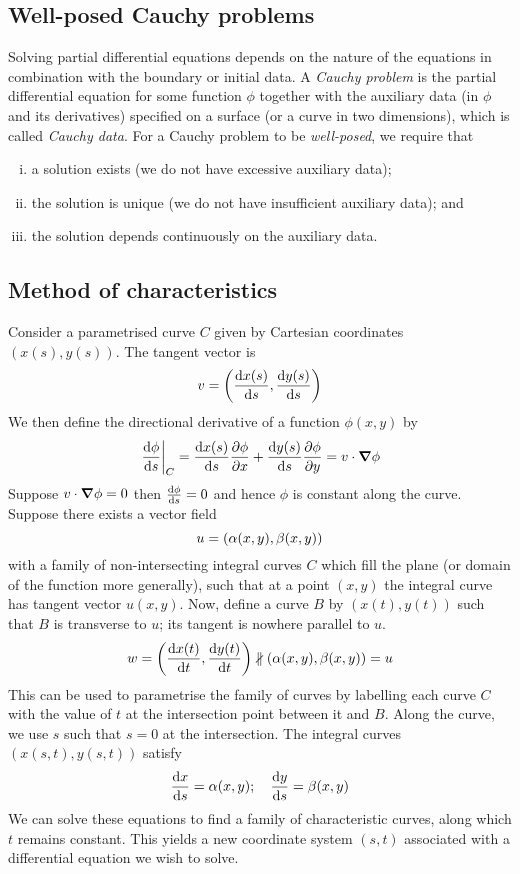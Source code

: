 \subsection{Well-posed Cauchy problems}
Solving partial differential equations depends on the nature of the equations in combination with the boundary or initial data.
A \textit{Cauchy problem} is the partial differential equation for some function \( \phi \) together with the auxiliary data (in \( \phi \) and its derivatives) specified on a surface (or a curve in two dimensions), which is called \textit{Cauchy data}.
For a Cauchy problem to be \textit{well-posed}, we require that
\begin{enumerate}[(i)]
	\item a solution exists (we do not have excessive auxiliary data);
	\item the solution is unique (we do not have insufficient auxiliary data); and
	\item the solution depends continuously on the auxiliary data.
\end{enumerate}

\subsection{Method of characteristics}
Consider a parametrised curve \( C \) given by Cartesian coordinates \( (x(s), y(s)) \).
The tangent vector is
\[
	v = \qty(\dv{x(s)}{s}, \dv{y(s)}{s})
\]
We then define the directional derivative of a function \( \phi(x,y) \) by
\[
	\eval{\dv{\phi}{s}}_C = \dv{x(s)}{s} \pdv{\phi}{x} + \dv{y(s)}{s}\pdv{\phi}{y} = v \cdot \grad{\phi}
\]
Suppose \( v \cdot \grad{\phi} = 0 \) then \( \dv{\phi}{s} = 0 \) and hence \( \phi \) is constant along the curve.
Suppose there exists a vector field
\[
	u = \qty(\alpha(x,y), \beta(x,y))
\]
with a family of non-intersecting integral curves \( C \) which fill the plane (or domain of the function more generally), such that at a point \( (x,y) \) the integral curve has tangent vector \( u(x,y) \).
Now, define a curve \( B \) by \( (x(t), y(t)) \) such that \( B \) is transverse to \( u \); its tangent is nowhere parallel to \( u \).
\[
	w = \qty(\dv{x(t)}{t}, \dv{y(t)}{t}) \nparallel \qty(\alpha(x,y), \beta(x,y)) = u
\]
This can be used to parametrise the family of curves by labelling each curve \( C \) with the value of \( t \) at the intersection point between it and \( B \).
Along the curve, we use \( s \) such that \( s = 0 \) at the intersection.
The integral curves \( (x(s,t), y(s,t)) \) satisfy
\[
	\dv{x}{s} = \alpha(x,y);\quad \dv{y}{s} = \beta(x,y)
\]
We can solve these equations to find a family of characteristic curves, along which \( t \) remains constant.
This yields a new coordinate system \( (s,t) \) associated with a differential equation we wish to solve.

